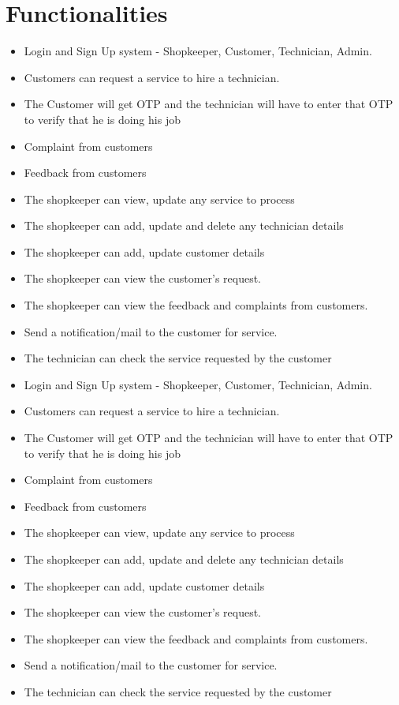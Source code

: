 \documentclass[conference]{IEEEtran}
\begin{document}
\section{Functionalities}
\begin{itemize}
\item Login and Sign Up system - Shopkeeper, Customer,
Technician, Admin.
\item Customers can request a service to hire a
technician.
\item The Customer will get OTP and the technician will
have to enter that OTP to verify that he is doing his
job
\item Complaint from customers
\item Feedback from customers
\item The shopkeeper can view, update any service to
process
\item The shopkeeper can add, update and delete any
technician details
\item The shopkeeper can add, update customer details
\item The shopkeeper can view the customer’s request.
\item The shopkeeper can view the feedback and
complaints from customers.
\item Send a notification/mail to the customer for service.
\item The technician can check the service requested by
the customer
\item Login and Sign Up system - Shopkeeper, Customer,
Technician, Admin.
\item Customers can request a service to hire a
technician.
\item The Customer will get OTP and the technician will
have to enter that OTP to verify that he is doing his
job
\item Complaint from customers
\item Feedback from customers
\item The shopkeeper can view, update any service to
process
\item The shopkeeper can add, update and delete any
technician details
\item The shopkeeper can add, update customer details
\item The shopkeeper can view the customer’s request.
\item The shopkeeper can view the feedback and
complaints from customers.
\item Send a notification/mail to the customer for service.
\item The technician can check the service requested by
the customer
\end{itemize}
\end{document}
